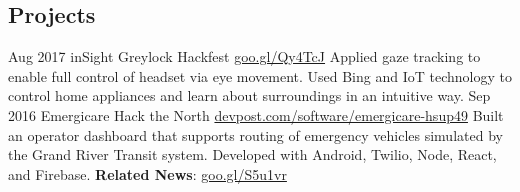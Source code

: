 \documentclass{resume}
\begin{document}
\begin{main}
    \section{Projects}
      \begin{entrylist}
        \rightentry%
          {Aug 2017}%
          {inSight}%
          {Greylock Hackfest}%
          {\href{https://goo.gl/Qy4TcJ}{goo.gl/Qy4TcJ}}%
          {%
          {%
            Applied gaze tracking to enable full control of headset via eye movement. %
          }%
          {%
            Used Bing and IoT technology to control home appliances and learn about surroundings %
            in an intuitive way. %
          }}
        \rightentry%
          {Sep 2016}%
          {Emergicare}%
          {Hack the North}%
          {\href{https://devpost.com/software/emergicare-hsup49}{devpost.com/software/emergicare-hsup49}}%
          {%
          {%
            Built an operator dashboard that supports routing of emergency vehicles simulated by %
            the Grand River Transit system. %
          }%
          {%
            Developed with Android, Twilio, Node, React, and Firebase. %
          }%
          {%
            \textbf{Related News}: \color{lightred}\href{https://goo.gl/S5u1vr}{goo.gl/S5u1vr}%
          }}
      \end{entrylist}
  \end{main}
\end{document}
